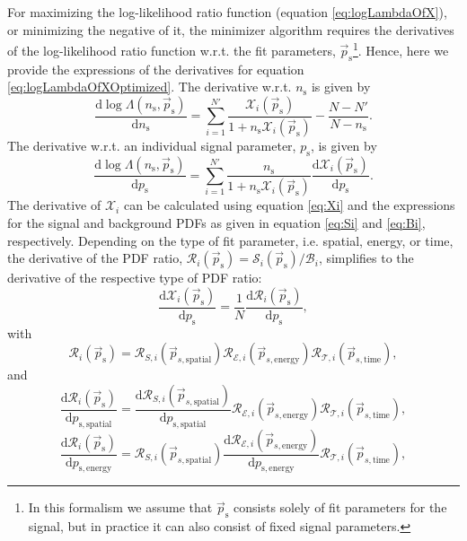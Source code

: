 \documentclass{article}
\newcommand{\ns}{n_{\mathrm{s}}}
\newcommand{\ps}{\vec{p}_{\mathrm{s}}}
\begin{document}
For maximizing the log-likelihood ratio function (equation \ref{eq:logLambdaOfX}),
or minimizing the negative of it, the minimizer algorithm requires the
derivatives of the log-likelihood ratio function w.r.t. the fit parameters, $\ps$\footnote{In this formalism we assume that $\ps$
consists solely of fit parameters for the signal, but in practice it can also consist of fixed
signal parameters.}. Hence, here we provide the expressions of the derivatives
for equation \ref{eq:logLambdaOfXOptimized}.
The derivative w.r.t. $\ns$ is given by
\begin{equation}
\frac{\mathrm{d} \log \Lambda(\ns,\ps)}{\mathrm{d} \ns} = \sum_{i=1}^{N'} \frac{\mathcal{X}_i(\ps)}{1+\ns \mathcal{X}_i(\ps)} - \frac{N - N'}{N - \ns}.
\end{equation}
The derivative w.r.t. an individual signal parameter, $p_{\mathrm{s}}$,
is given by
\begin{equation}
 \frac{\mathrm{d} \log \Lambda(\ns,\ps)}{\mathrm{d} p_{\mathrm{s}}} = \sum_{i=1}^{N'} \frac{\ns}{1+\ns\mathcal{X}_i(\ps)} \frac{\mathrm{d} \mathcal{X}_i(\ps)}{\mathrm{d} p_{\mathrm{s}}}.
\end{equation}
The derivative of $\mathcal{X}_i$ can be calculated using
equation \ref{eq:Xi} and the expressions for the signal and background PDFs as given
in equation \ref{eq:Si} and \ref{eq:Bi}, respectively. Depending on the type of
fit parameter, i.e. spatial, energy, or time, the derivative of the PDF ratio,
$\mathcal{R}_i(\ps) = \mathcal{S}_i(\ps) / \mathcal{B}_i$, simplifies to the
derivative of the respective type of PDF ratio:
\begin{equation}
 \frac{\mathrm{d} \mathcal{X}_i(\ps)}{\mathrm{d} p_{\mathrm{s}}} = \frac{1}{N}\frac{\mathrm{d} \mathcal{R}_i(\ps)}{\mathrm{d} p_{\mathrm{s}}},
\end{equation}
with
\begin{equation}
 \mathcal{R}_i(\ps) = \mathcal{R}_{S,i}(\vec{p}_{s,\mathrm{spatial}}) \mathcal{R}_{\mathcal{E},i}(\vec{p}_{s,\mathrm{energy}}) \mathcal{R}_{\mathcal{T},i}(\vec{p}_{s,\mathrm{time}}),
 \label{eq:Ri}
\end{equation}
and
\begin{equation}
 \frac{\mathrm{d} \mathcal{R}_i(\ps)}{\mathrm{d} p_{\mathrm{s,spatial}}} = \frac{\mathrm{d} \mathcal{R}_{S,i}(\vec{p}_{s,\mathrm{spatial}})}{\mathrm{d} p_{\mathrm{s,spatial}}} \mathcal{R}_{\mathcal{E},i}(\vec{p}_{s,\mathrm{energy}}) \mathcal{R}_{\mathcal{T},i}(\vec{p}_{s,\mathrm{time}}),
\end{equation}
\begin{equation}
 \frac{\mathrm{d} \mathcal{R}_i(\ps)}{\mathrm{d} p_{\mathrm{s,energy}}} = \mathcal{R}_{S,i}(\vec{p}_{s,\mathrm{spatial}}) \frac{\mathrm{d} \mathcal{R}_{\mathcal{E},i}(\vec{p}_{s,\mathrm{energy}})}{\mathrm{d} p_{\mathrm{s,energy}}} \mathcal{R}_{\mathcal{T},i}(\vec{p}_{s,\mathrm{time}}),
\end{equation}
\end{document}
